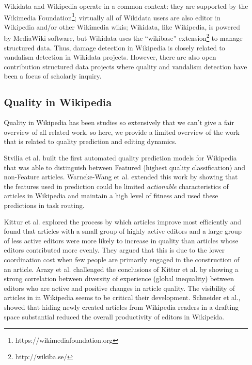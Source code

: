 \documentclass{sig-alternate}
\begin{document}
Wikidata and Wikipedia operate in a common context: they are supported by the Wikimedia Foundation\footnote{https://wikimediafoundation.org}; virtually all of Wikidata users are also editor in Wikipedia and/or other Wikimedia wikis; Wikidata, like Wikipedia, is powered by MediaWiki software, but Wikidata uses the ``wikibase'' extension\footnote{http://wikiba.se/} to manage structured data. Thus, damage detection in Wikipedia is closely related to vandalism detection in Wikidata projects. However, there are also open contribution structured data projects where quality and vandalism detection have been a focus of scholarly inquiry.

\subsection{Quality in Wikipedia}
Quality in Wikipedia has been studies so extensively that we can't give a fair overview of all related work, so here, we provide a limited overview of the work that is related to quality prediction and editing dynamics.

Stvilia et al. built the first automated quality prediction models for Wikipedia that was able to distinguish between Featured (highest quality classification) and non-Feature articles\cite{stvilia:assessing}.  Warncke-Wang et al. extended this work by showing that the features used in prediction could be limited \textit{actionable} characteristics of articles in Wikipedia and maintain a high level of fitness\cite{warncke:tell} and used these predictions in task routing.

Kittur et al. explored the process by which articles improve most efficiently and found that articles with a small group of highly active editors and a large group of less active editors were more likely to increase in quality than articles whose editors contributed more evenly\cite{kittur:harnessing}. They argued that this is due to the lower coordination cost when few people are primarily engaged in the construction of an article.  Arazy et al. challenged the conclusions of Kittur et al. by showing a strong correlation between diversity of experience (global inequality) between editors who are active and positive changes in article quality\cite{arazy:determinants}. The visibility of articles in in Wikipedia seems to be critical their development.  Schneider et al., showed that hiding newly created articles from Wikipedia readers in a drafting space substantial reduced the overall productivity of editors in Wikipeida\cite{schneider:accept}.
\end{document}
